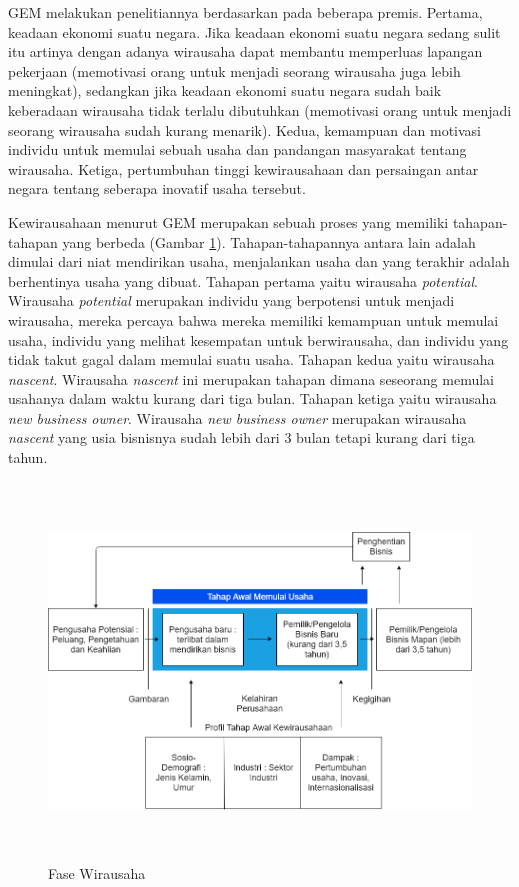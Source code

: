 GEM melakukan penelitiannya berdasarkan pada beberapa premis. Pertama, keadaan ekonomi suatu negara. Jika keadaan ekonomi suatu negara sedang sulit itu artinya dengan adanya wirausaha dapat membantu memperluas lapangan pekerjaan (memotivasi orang untuk menjadi seorang wirausaha juga lebih meningkat), sedangkan jika keadaan ekonomi suatu negara sudah baik keberadaan wirausaha tidak terlalu dibutuhkan (memotivasi orang untuk menjadi seorang wirausaha sudah kurang menarik). Kedua, kemampuan dan motivasi individu untuk memulai sebuah usaha dan pandangan masyarakat tentang wirausaha. Ketiga, pertumbuhan tinggi kewirausahaan dan persaingan antar negara tentang seberapa inovatif usaha tersebut. \cite{GEM2013}

Kewirausahaan menurut GEM merupakan sebuah proses yang memiliki tahapan-tahapan yang berbeda (Gambar \ref{fig:fasewirausaha}). Tahapan-tahapannya antara lain adalah dimulai dari niat mendirikan usaha, menjalankan usaha dan yang terakhir adalah berhentinya usaha yang dibuat. Tahapan pertama yaitu wirausaha \textit{potential}. Wirausaha \textit{potential} merupakan individu yang berpotensi untuk menjadi wirausaha, mereka percaya bahwa mereka memiliki kemampuan untuk memulai usaha, individu yang melihat kesempatan untuk berwirausaha, dan individu yang tidak takut gagal dalam memulai suatu usaha. Tahapan kedua yaitu wirausaha \textit{nascent}. Wirausaha \textit{nascent} ini merupakan tahapan dimana seseorang memulai usahanya dalam waktu kurang dari tiga bulan. Tahapan ketiga yaitu wirausaha \textit{new business owner}. Wirausaha \textit{new business owner} merupakan wirausaha \textit{nascent} yang usia bisnisnya sudah lebih dari 3 bulan tetapi kurang dari tiga tahun.

\begin{figure} [H]
	\centering  
	\includegraphics[width=16cm, height=10cm]{FaseWirausahaa}  
	\caption[Fase Wirausaha]{Fase Wirausaha} 
	\label{fig:fasewirausaha} 
\end{figure}

